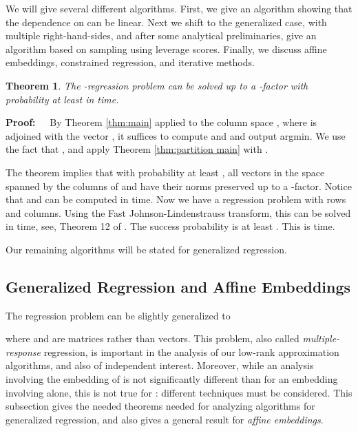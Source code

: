 \documentclass{sig-alternate}
\newtheorem{theorem}{Theorem}
\def\FullBox{\hbox{\vrule width 8pt height 8pt depth 0pt}}
\def\qed{\ifmmode\qquad\FullBox\else{\unskip\nobreak\hfil
\penalty50\hskip1em\null\nobreak\hfil\FullBox
\parfillskip=0pt\finalhyphendemerits=0\endgraf}\fi}
\newenvironment{proof}{\begin{trivlist} \item {\bf Proof:~~}}
  {\qed\end{trivlist}}
\begin{document}
We will give several different algorithms.
First, we give an algorithm showing that the dependence on  can be linear.
Next we shift to the generalized case, with multiple right-hand-sides,
and after some analytical preliminaries, give an algorithm based on sampling
using leverage scores. Finally, we discuss affine embeddings, constrained regression,
and iterative methods.




\begin{theorem}\label{thm:lin reg}
The -regression problem can be solved up to a -factor with probability at least 
 in  time.
\end{theorem}
\begin{proof}
By Theorem \ref{thm:main} applied to the column space ,
where  is  adjoined with the vector ,
it suffices to compute  and  and output 
argmin. We use the fact that , and apply
Theorem \ref{thm:partition main} with . 

The theorem implies that with probability at least , 
all vectors  in the
space spanned by the columns of  and  
have their norms preserved up to a -factor. 
Notice that  and  can be computed in 
 time. Now we have a regression problem with  rows
and  columns. 
Using the Fast Johnson-Lindenstrauss
transform, this can be solved in  time, see, Theorem 12 of \cite{s06}. The
success probability is at least . This is  time. 
\end{proof}




Our remaining algorithms will be stated for generalized regression.

\subsection{Generalized Regression and Affine Embeddings}

The regression problem can be slightly generalized to

where  and  are matrices rather than vectors. This problem,
also called \emph{multiple-response} regression,
is important in the analysis of our low-rank approximation algorithms,
and also of independent interest. Moreover, while an analysis involving
the embedding of  is not significantly different than for an embedding
involving  alone, this is not true for : different techniques must 
be considered. This subsection gives the needed theorems
needed for analyzing algorithms for generalized regression,
and also gives a general result for \emph{affine embeddings}.
\end{document}
